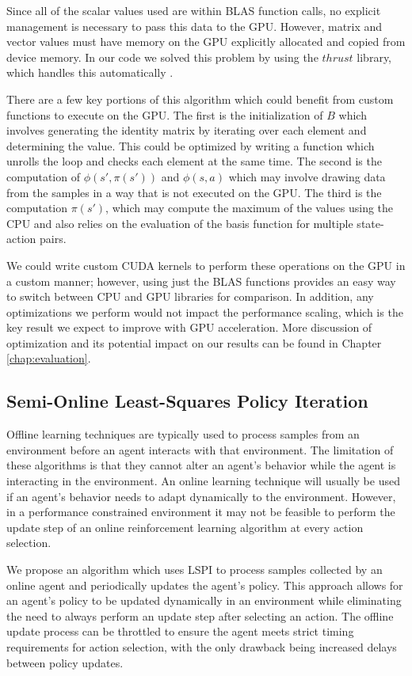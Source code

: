 Since all of the scalar values used are within BLAS function calls, no explicit management is necessary to pass this data to the GPU. However, matrix and vector values must have memory on the GPU explicitly allocated and copied from device memory. In our code we solved this problem by using the $thrust$ library, which handles this automatically \cite{thrust}.

There are a few key portions of this algorithm which could benefit from custom functions to execute on the GPU. The first is the initialization of $B$ which involves generating the identity matrix by iterating over each element and determining the value. This could be optimized by writing a function which unrolls the loop and checks each element at the same time. The second is the computation of $\phi(s',\pi(s'))$ and $\phi(s,a)$ which may involve drawing data from the samples in a way that is not executed on the GPU. The third is the computation $\pi(s')$, which may compute the maximum of the values using the CPU and also relies on the evaluation of the basis function for multiple state-action pairs.

We could write custom CUDA kernels to perform these operations on the GPU in a custom manner; however, using just the BLAS functions provides an easy way to switch between CPU and GPU libraries for comparison. In addition, any optimizations we perform would not impact the performance scaling, which is the key result we expect to improve with GPU acceleration. More discussion of optimization and its potential impact on our results can be found in Chapter \ref{chap:evaluation}.

\subsection{Semi-Online Least-Squares Policy Iteration}

Offline learning techniques are typically used to process samples from an environment before an agent interacts with that environment. The limitation of these algorithms is that they cannot alter an agent's behavior while the agent is interacting in the environment. An online learning technique will usually be used if an agent's behavior needs to adapt dynamically to the environment. However, in a performance constrained environment it may not be feasible to perform the update step of an online reinforcement learning algorithm at every action selection.

We propose an algorithm which uses LSPI to process samples collected by an online agent and periodically updates the agent's policy. This approach allows for an agent's policy to be updated dynamically in an environment while eliminating the need to always perform an update step after selecting an action. The offline update process can be throttled to ensure the agent meets strict timing requirements for action selection, with the only drawback being increased delays between policy updates.

